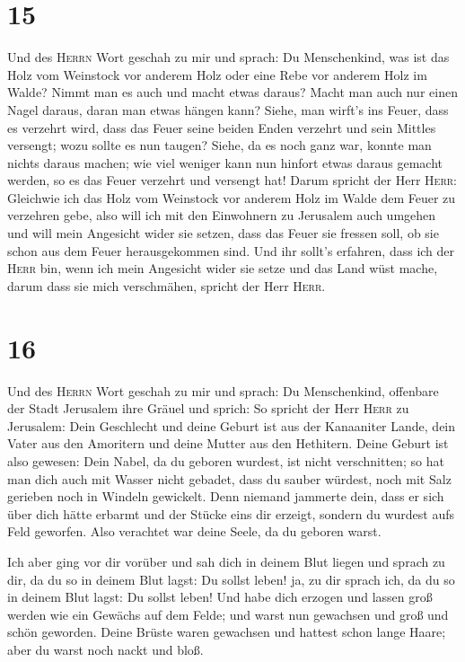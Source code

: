 \hypertarget{section-14}{%
\section{15}\label{section-14}}

 Und des \textsc{Herrn} Wort geschah zu mir und sprach:
 Du Menschenkind, was ist das Holz vom Weinstock vor
anderem Holz oder eine Rebe vor anderem Holz im Walde? 
Nimmt man es auch und macht etwas daraus? Macht man auch nur einen Nagel
daraus, daran man etwas hängen kann?  Siehe, man wirft's
ins Feuer, dass es verzehrt wird, dass das Feuer seine beiden Enden
verzehrt und sein Mittles versengt; wozu sollte es nun taugen?
 Siehe, da es noch ganz war, konnte man nichts daraus
machen; wie viel weniger kann nun hinfort etwas daraus gemacht werden,
so es das Feuer verzehrt und versengt hat!  Darum spricht
der Herr \textsc{Herr}: Gleichwie ich das Holz vom Weinstock vor anderem
Holz im Walde dem Feuer zu verzehren gebe, also will ich mit den
Einwohnern zu Jerusalem auch umgehen  und will mein
Angesicht wider sie setzen, dass das Feuer sie fressen soll, ob sie
schon aus dem Feuer herausgekommen sind. Und ihr sollt's erfahren, dass
ich der \textsc{Herr} bin, wenn ich mein Angesicht wider sie setze
 und das Land wüst mache, darum dass sie mich verschmähen,
spricht der Herr \textsc{Herr}.

\hypertarget{section-15}{%
\section{16}\label{section-15}}

 Und des \textsc{Herrn} Wort geschah zu mir und sprach:
 Du Menschenkind, offenbare der Stadt Jerusalem ihre
Gräuel und sprich:  So spricht der Herr \textsc{Herr} zu
Jerusalem: Dein Geschlecht und deine Geburt ist aus der Kanaaniter
Lande, dein Vater aus den Amoritern und deine Mutter aus den Hethitern.
 Deine Geburt ist also gewesen: Dein Nabel, da du geboren
wurdest, ist nicht verschnitten; so hat man dich auch mit Wasser nicht
gebadet, dass du sauber würdest, noch mit Salz gerieben noch in Windeln
gewickelt.  Denn niemand jammerte dein, dass er sich über
dich hätte erbarmt und der Stücke eins dir erzeigt, sondern du wurdest
aufs Feld geworfen. Also verachtet war deine Seele, da du geboren warst.

 Ich aber ging vor dir vorüber und sah dich in deinem Blut
liegen und sprach zu dir, da du so in deinem Blut lagst: Du sollst
leben! ja, zu dir sprach ich, da du so in deinem Blut lagst: Du sollst
leben!  Und habe dich erzogen und lassen groß werden wie
ein Gewächs auf dem Felde; und warst nun gewachsen und groß und schön
geworden. Deine Brüste waren gewachsen und hattest schon lange Haare;
aber du warst noch nackt und bloß.

